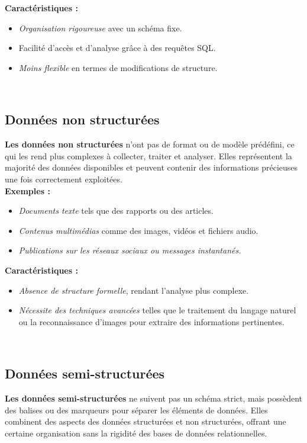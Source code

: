 \documentclass[a4paper,12pt]{report}
\begin{document}
            \textbf{Caractéristiques :}
            \begin{itemize}
                \item \textit{Organisation rigoureuse} avec un schéma fixe.
                \item Facilité d'accès et d'analyse grâce à des requêtes SQL.
                \item \textit{Moins flexible} en termes de modifications de structure.
            \end{itemize}\\


        \subsection{Données non structurées}
            \textbf{Les données non structurées} n'ont pas de format ou de modèle prédéfini, ce qui les rend plus complexes à collecter, traiter et analyser. Elles représentent la majorité des données disponibles et peuvent contenir des informations précieuses une fois correctement exploitées.\\

            \textbf{Exemples :}
            \begin{itemize}
                \item \textit{Documents texte} tels que des rapports ou des articles.
                \item \textit{Contenus multimédias} comme des images, vidéos et fichiers audio.
                \item \textit{Publications sur les réseaux sociaux ou messages instantanés.}
            \end{itemize}
            
            \textbf{Caractéristiques :}
            \begin{itemize}
                \item \textit{Absence de structure formelle}, rendant l'analyse plus complexe.
                \item \textit{Nécessite des techniques avancées} telles que le traitement du langage naturel ou la reconnaissance d'images pour extraire des informations pertinentes.
            \end{itemize}\\

        \subsection{Données semi-structurées}
            \textbf{Les données semi-structurées} ne suivent pas un schéma strict, mais possèdent des balises ou des marqueurs pour séparer les éléments de données. Elles combinent des aspects des données structurées et non structurées, offrant une certaine organisation sans la rigidité des bases de données relationnelles.\\
\end{document}
